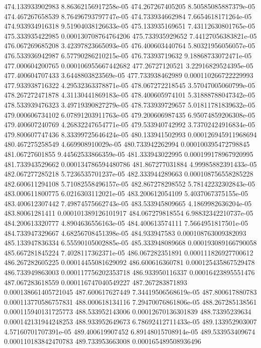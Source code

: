 {474.133933902983 8.86362156917258e-05
474.267267405205 8.50585085887379e-05
474.467267658539 8.76496793797747e-05
474.733934662984 7.6654618171264e-05
474.933934916318 9.51904038126633e-05
475.133935169651 7.43112630801765e-05
475.333935422985 0.000130708764764206
475.733935929652 7.44127056383821e-05
476.067269685208 3.42397823665093e-05
476.400603440764 5.80321956056057e-05
476.533936942987 6.57790286210215e-05
476.73393719632 9.18868733072471e-05
477.000604200765 0.000106955667442682
477.26727120521 3.22916829524395e-05
477.400604707433 3.6448803823569e-05
477.733938462989 0.000110266722229993
477.933938716322 4.29532363378871e-05
478.067272218545 3.57047005060799e-05
478.267272471878 4.31130441869183e-05
478.400605974101 5.31888788047342e-05
478.533939476323 3.49719390827279e-05
478.733939729657 5.01811781839632e-05
479.000606734102 6.07891203911763e-05
479.200606987435 6.95074859206308e-05
479.400607240769 4.26832247654771e-05
479.533940742992 3.73702424916834e-05
479.800607747436 8.33399725646424e-05
480.133941502993 0.000126945911968694
480.467275258549 4.669908910029e-05
480.733942262994 0.000100395472798845
481.06727601855 9.44562533866359e-05
481.333943022995 0.000199178967920995
481.733943529662 0.000134786594480786
481.867277031884 4.99985882391433e-05
482.067277285218 5.7236535701237e-05
482.333944289663 0.000108756558285228
482.600611294108 5.71082558496157e-05
482.867278298552 5.78142232302843e-05
483.000611800775 6.0216303112021e-05
483.200612054109 5.4037067375155e-05
483.400612307442 7.49874575662743e-05
483.533945809665 4.1869982636204e-05
483.80061281411 0.000101389126101917
484.067279818554 6.98832342210737e-05
484.200613320777 4.8904636556163e-05
484.400613574111 7.5664951817501e-05
484.733947329667 4.68256708451398e-05
484.933947583 0.000108763009382093
485.133947836334 6.55590105002885e-05
485.333948089668 0.000193089166790058
485.667281845224 7.4028117362371e-05
486.067282351891 0.000111826927700612
486.267282605225 0.00014455081629092
486.600616360781 0.000125435867529478
486.733949863003 0.000117756202353718
486.933950116337 0.00016423895551476
487.067283618559 0.000116747040549227
487.267283871893 0.000138661405721045
487.600617627449 7.34419506568619e-05
487.800617880783 0.000113770586757831
488.000618134116 7.29470076861806e-05
488.267285138561 0.000115940131725773
488.533952143006 0.00012670136301839
488.73395239634 0.000142131944248253
488.933952649673 6.78692412711433e-05
489.133952903007 4.57160701707391e-05
489.400619907452 6.89148015708914e-05
489.533953409674 0.000110183842470783
489.733953663008 0.000165489508936496
}
